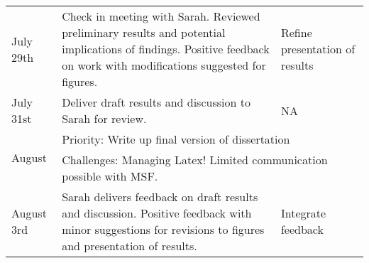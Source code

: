 \begin{singlespace}
\begin{longtable}{|p{2cm}|p{5cm}|p{5cm}}
July 29th               & Check in meeting with Sarah. Reviewed preliminary results and potential implications of findings. Positive feedback on work with modifications suggested for figures.                                                                                 & Refine presentation of results                                                                                                                                                                                              \\
July 31st               & Deliver draft results and discussion to Sarah for review.                                                                                                                                                                                             & NA                                                                                                                                                                                                                          \\ 
\hline
\multirow{2}{*}{August} & \multicolumn{2}{p{8cm}}{Priority: Write up final version of dissertation}                                                                                                                                                                                                                                                                                                                                                                                                                \\
                        & \multicolumn{2}{p{8cm}}{Challenges: Managing Latex! Limited communication possible with MSF.}                                                                                                                                                                                                                                                                                                                                                                                            \\ 
\hline
August 3rd              & Sarah delivers feedback on draft results and discussion. Positive feedback with minor suggestions for revisions to figures and presentation of results.                                                                                               & Integrate feedback                                                                                                                                                                                                          \\

\end{longtable}
\end{singlespace}
